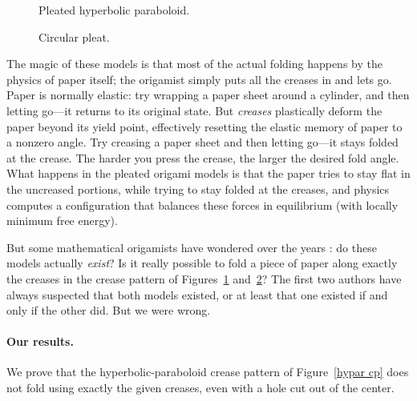 \documentclass[11pt,letterpaper]{article}
\begin{document}
\begin{figure}
  \centering
  \hfil
  \caption{Pleated hyperbolic paraboloid.}
  \label{hypar}
\end{figure}

\begin{figure}
  \centering
  \hfil
  \caption{Circular pleat.}
  \label{circular}
\end{figure}

The magic of these models is that most of the actual folding happens by
the physics of paper itself; the origamist simply puts all the creases in
and lets go.  Paper is normally elastic: try wrapping a paper sheet
around a cylinder, and then letting go---it returns to its original state.
But \emph{creases} plastically deform the paper beyond its yield point,
effectively resetting the elastic memory of paper to a nonzero angle.
Try creasing a paper sheet and then letting go---it stays folded at the crease.
The harder you press the crease, the larger the desired fold angle.
What happens in the pleated origami models is that the paper tries to
stay flat in the uncreased portions, while trying to stay folded at the
creases, and physics computes a configuration that balances these forces
in equilibrium (with locally minimum free energy).

But some mathematical origamists have wondered over the years \cite{nytimes}:
do these models actually \emph{exist}?  Is it really possible to fold
a piece of paper along exactly the creases in the crease pattern of
Figures~\ref{hypar} and~\ref{circular}?
The first two authors have always suspected that both models existed,
or at least that one existed if and only if the other did.
But we were wrong.

\paragraph{Our results.}
We prove that the hyperbolic-paraboloid crease pattern of Figure~\ref{hypar cp}
does not fold using exactly the given creases,
even with a hole cut out of the center.
\end{document}
